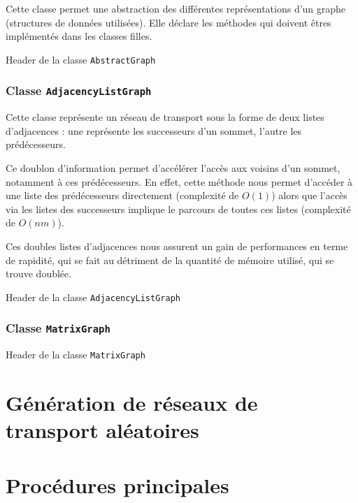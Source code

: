 Cette classe permet une abstraction des différentes représentations d'un graphe (structures de données utilisées). Elle déclare les méthodes qui doivent êtres implémentés dans les classes filles.

Header de la classe \texttt{AbstractGraph}



\subsubsection{Classe \texttt{AdjacencyListGraph}}
Cette classe représente un réseau de transport sous la forme
de deux listes d'adjacences : une représente les 
successeurs d'un sommet, l'autre les prédécesseurs.

Ce doublon d'information permet d'accélérer l'accès aux voisins d'un sommet, notamment à ces prédécesseurs. En effet, cette méthode nous permet d'accéder à une liste des prédécesseurs directement (complexité de $O(1)$) alors que l'accès via les listes des successeurs implique le parcours de toutes ces listes (complexité de $O(nm)$).

Ces doubles listes d'adjacences nous assurent un gain de performances en terme de rapidité, qui se fait au détriment de la quantité de mémoire utilisé, qui se trouve doublée.

Header de la classe \texttt{AdjacencyListGraph}




\subsubsection{Classe \texttt{MatrixGraph}}

Header de la classe \texttt{MatrixGraph}



\section{Génération de réseaux de transport aléatoires}



\section{Procédures principales}

